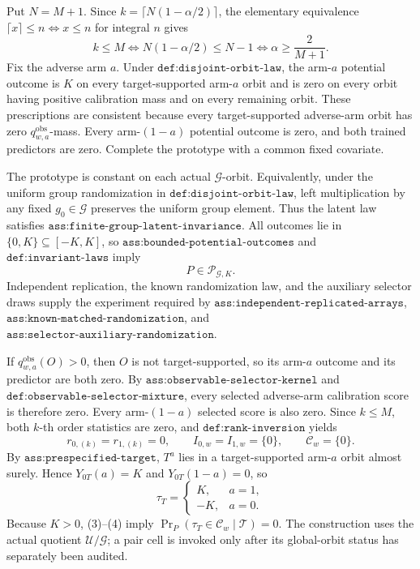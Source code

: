 Put \(N=M+1\). Since \(k=\lceil N(1-\alpha/2)\rceil\), the elementary equivalence \(\lceil x\rceil\le n\Longleftrightarrow x\le n\) for integral \(n\) gives
\[
k\le M
\Longleftrightarrow N(1-\alpha/2)\le N-1
\Longleftrightarrow \alpha\ge \frac{2}{M+1}.
\tag{1}
\]
Fix the adverse arm \(a\). Under \(\texttt{def:disjoint-orbit-law}\), the arm-\(a\) potential outcome is \(K\) on every target-supported arm-\(a\) orbit and is zero on every orbit having positive calibration mass and on every remaining orbit. These prescriptions are consistent because every target-supported adverse-arm orbit has zero \(q^{\mathrm{obs}}_{w,a}\)-mass. Every arm-\((1-a)\) potential outcome is zero, and both trained predictors are zero. Complete the prototype with a common fixed covariate.

The prototype is constant on each actual \(\mathcal G\)-orbit. Equivalently, under the uniform group randomization in \(\texttt{def:disjoint-orbit-law}\), left multiplication by any fixed \(g_0\in\mathcal G\) preserves the uniform group element. Thus the latent law satisfies \(\texttt{ass:finite-group-latent-invariance}\). All outcomes lie in \(\{0,K\}\subseteq[-K,K]\), so \(\texttt{ass:bounded-potential-outcomes}\) and \(\texttt{def:invariant-laws}\) imply
\[
P\in\mathcal P_{\mathcal G,K}.
\tag{2}
\]
Independent replication, the known randomization law, and the auxiliary selector draws supply the experiment required by \(\texttt{ass:independent-replicated-arrays}\), \(\texttt{ass:known-matched-randomization}\), and \(\texttt{ass:selector-auxiliary-randomization}\).

If \(q^{\mathrm{obs}}_{w,a}(O)>0\), then \(O\) is not target-supported, so its arm-\(a\) outcome and its predictor are both zero. By \(\texttt{ass:observable-selector-kernel}\) and \(\texttt{def:observable-selector-mixture}\), every selected adverse-arm calibration score is therefore zero. Every arm-\((1-a)\) selected score is also zero. Since \(k\le M\), both \(k\)-th order statistics are zero, and \(\texttt{def:rank-inversion}\) yields
\[
r_{0,(k)}=r_{1,(k)}=0,\qquad I_{0,w}=I_{1,w}=\{0\},\qquad \mathcal C_w=\{0\}.
\tag{3}
\]
By \(\texttt{ass:prespecified-target}\), \(T^a\) lies in a target-supported arm-\(a\) orbit almost surely. Hence \(Y_{0T}(a)=K\) and \(Y_{0T}(1-a)=0\), so
\[
\tau_T=\begin{cases}K,&a=1,\\-K,&a=0.\end{cases}
\tag{4}
\]
Because \(K>0\), (3)--(4) imply \(\Pr_P(\tau_T\in\mathcal C_w\mid\mathcal T)=0\). The construction uses the actual quotient \(\mathcal U/\mathcal G\); a pair cell is invoked only after its global-orbit status has separately been audited.